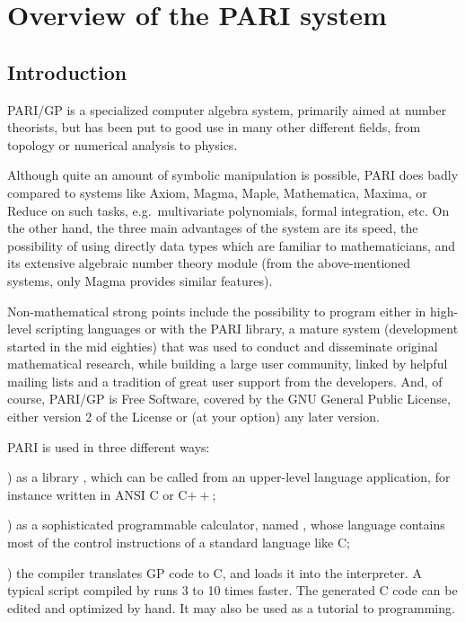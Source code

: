 %
%
\chapter{Overview of the PARI system}

\section{Introduction}

\noindent
PARI/GP is a specialized computer algebra system, primarily aimed at number
theorists, but has been put to good use in many other different fields, from
topology or numerical analysis to physics.

Although quite an amount of symbolic manipulation is possible, PARI does
badly compared to systems like Axiom, Magma, Maple, Mathematica, Maxima, or
Reduce on such tasks, e.g.~multivariate polynomials, formal integration,
etc. On the other hand, the three main advantages of the system are its
speed, the possibility of using directly data types which are familiar to
mathematicians, and its extensive algebraic number theory module (from
the above-mentioned systems, only Magma provides similar features).

Non-mathematical strong points include the possibility to program either
in high-level scripting languages or with the PARI library, a mature system
(development started in the mid eighties) that was used to conduct and
disseminate original mathematical research, while building a large user
community, linked by helpful mailing lists and a tradition of great user
support from the developers. And, of course, PARI/GP is Free Software,
covered by the GNU General Public License, either version 2 of the License or
(at your option) any later version.

PARI is used in three different ways:

) as a library , which can be called from an upper-level
language application, for instance written in ANSI C or C$++$;

) as a sophisticated programmable calculator, named , whose
language  contains most of the control instructions of a standard
language like C;

) the compiler  translates GP code to C, and loads it into
the  interpreter. A typical script compiled by  runs 3 to 10
times faster. The generated C code can be edited and optimized by hand. It
may also be used as a tutorial to  programming.

